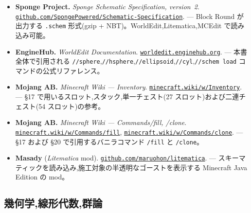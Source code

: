 \documentclass[12pt,a4paper]{scrartcl}
\newcommand{\code}[1]{\texttt{\small #1}}
\newcommand{\cmd}[1]{\textcolor{earth}{\texttt{\small #1}}}
\newcommand{\biblink}[2]{\href{#1}{\nolinkurl{#2}}}
\begin{document}
\begin{itemize}[leftmargin=1.4em,itemsep=0.3em,topsep=0.3em]
  \item \textbf{Sponge Project.} \emph{Sponge Schematic Specification, version~2}.
        \biblink{https://github.com/SpongePowered/Schematic-Specification}{github.com/SpongePowered/Schematic-Specification}.
        --- Block Round が出力する \code{.schem} 形式(gzip + NBT)。WorldEdit,Litematica,MCEdit で読み込み可能。

  \item \textbf{EngineHub.} \emph{WorldEdit Documentation}.
        \biblink{https://worldedit.enginehub.org/}{worldedit.enginehub.org}.
        --- 本書全体で引用される \cmd{//sphere},\cmd{//hsphere},\cmd{//ellipsoid},\cmd{//cyl},\cmd{//schem load} コマンドの公式リファレンス。

  \item \textbf{Mojang AB.} \emph{Minecraft Wiki --- Inventory}.
        \biblink{https://minecraft.wiki/w/Inventory}{minecraft.wiki/w/Inventory}.
        --- §17 で用いるスロット,スタック,単一チェスト(27 スロット)および二連チェスト(54 スロット)の参考。

  \item \textbf{Mojang AB.} \emph{Minecraft Wiki --- Commands/fill, /clone}.
        \biblink{https://minecraft.wiki/w/Commands/fill}{minecraft.wiki/w/Commands/fill},
        \biblink{https://minecraft.wiki/w/Commands/clone}{minecraft.wiki/w/Commands/clone}.
        --- §17 および §20 で引用するバニラコマンド \cmd{/fill} と \cmd{/clone}。

  \item \textbf{Masady} (\emph{Litematica} mod).
        \biblink{https://github.com/maruohon/litematica}{github.com/maruohon/litematica}.
        --- スキーマティックを読み込み,施工対象の半透明なゴーストを表示する Minecraft Java Edition の mod。
\end{itemize}

\subsection*{幾何学,線形代数,群論}
\end{document}
